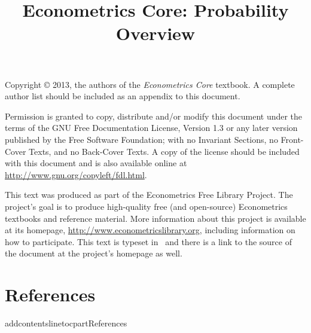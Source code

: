 \documentclass{tex/tufte-handout}
\title{Econometrics Core: Probability Overview}
\begin{document}
\maketitle

\bigskip\noindent%
Copyright © 2013, the authors of the \textit{Econometrics Core}
textbook.  A complete author list should be included as an appendix to
this document.

Permission is granted to copy, distribute and/or modify this document
under the terms of the GNU Free Documentation License, Version 1.3 or
any later version published by the Free Software Foundation; with no
Invariant Sections, no Front-Cover Texts, and no Back-Cover Texts.  A
copy of the license should be included with this document and is also
available online at \url{http://www.gnu.org/copyleft/fdl.html}.

This text was produced as part of the Econometrics Free Library
Project.  The project's goal is to produce high-quality free (and
open-source) Econometrics textbooks and reference material.  More
information about this project is available at its homepage,
\url{http://www.econometricslibrary.org}, including information on how
to participate.  This text is typeset in \XeLaTeX\ and there is a link
to the source of the document at the project's homepage as well.

\tableofcontents
\newpage
{}
\setcounter{page}{1}









\part*{References}%
addcontentsline{toc}{part}{References}

\end{document}
